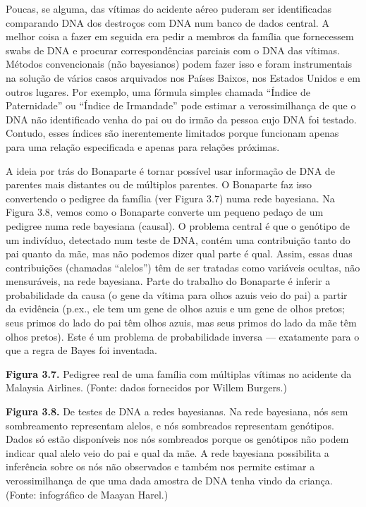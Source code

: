 \documentclass[11pt,a5paper,twoside]{book}
\begin{document}
Poucas, se alguma, das vítimas do acidente aéreo puderam ser identificadas comparando DNA dos destroços com DNA num banco de dados central. A melhor coisa a fazer em seguida era pedir a membros da família que fornecessem swabs de DNA e procurar correspondências parciais com o DNA das vítimas. Métodos convencionais (não bayesianos) podem fazer isso e foram instrumentais na solução de vários casos arquivados nos Países Baixos, nos Estados Unidos e em outros lugares. Por exemplo, uma fórmula simples chamada “Índice de Paternidade” ou “Índice de Irmandade” pode estimar a verossimilhança de que o DNA não identificado venha do pai ou do irmão da pessoa cujo DNA foi testado. Contudo, esses índices são inerentemente limitados porque funcionam apenas para uma relação especificada e apenas para relações próximas.

A ideia por trás do Bonaparte é tornar possível usar informação de DNA de parentes mais distantes ou de múltiplos parentes. O Bonaparte faz isso convertendo o pedigree da família (ver Figura 3.7) numa rede bayesiana. Na Figura 3.8, vemos como o Bonaparte converte um pequeno pedaço de um pedigree numa rede bayesiana (causal). O problema central é que o genótipo de um indivíduo, detectado num teste de DNA, contém uma contribuição tanto do pai quanto da mãe, mas não podemos dizer qual parte é qual. Assim, essas duas contribuições (chamadas “alelos”) têm de ser tratadas como variáveis ocultas, não mensuráveis, na rede bayesiana. Parte do trabalho do Bonaparte é inferir a probabilidade da causa (o gene da vítima para olhos azuis veio do pai) a partir da evidência (p.ex., ele tem um gene de olhos azuis e um gene de olhos pretos; seus primos do lado do pai têm olhos azuis, mas seus primos do lado da mãe têm olhos pretos). Este é um problema de probabilidade inversa — exatamente para o que a regra de Bayes foi inventada.

\textbf{Figura 3.7.} Pedigree real de uma família com múltiplas vítimas no acidente da Malaysia Airlines. (Fonte: dados fornecidos por Willem Burgers.)

\textbf{Figura 3.8.} De testes de DNA a redes bayesianas. Na rede bayesiana, nós sem sombreamento representam alelos, e nós sombreados representam genótipos. Dados só estão disponíveis nos nós sombreados porque os genótipos não podem indicar qual alelo veio do pai e qual da mãe. A rede bayesiana possibilita a inferência sobre os nós não observados e também nos permite estimar a verossimilhança de que uma dada amostra de DNA tenha vindo da criança. (Fonte: infográfico de Maayan Harel.)
\end{document}

